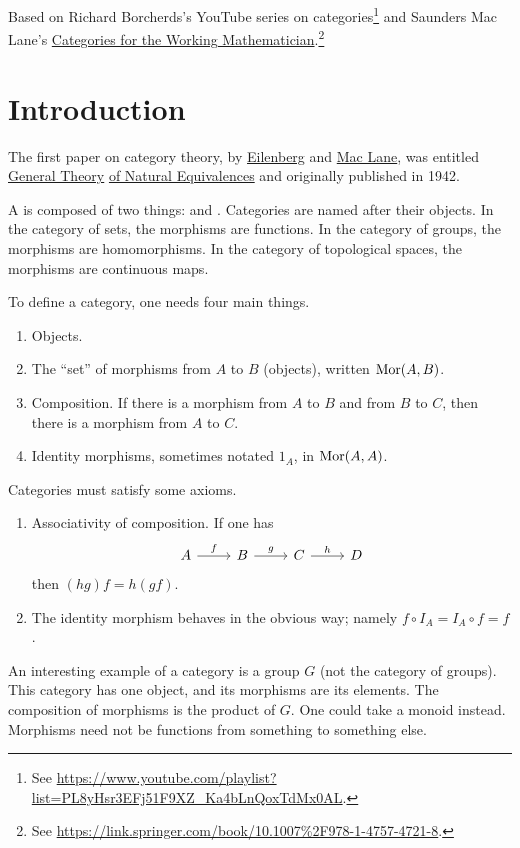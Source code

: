 \documentclass[11pt, oneside]{article}
\begin{document}
\maketitle
Based on {Richard Borcherds's YouTube series on categories}\footnote{See \url{https://www.youtube.com/playlist?list=PL8yHsr3EFj51F9XZ\_Ka4bLnQoxTdMx0AL}.} and Saunders Mac Lane's {\underline{Categories for the Working Mathematician}}.\footnote{See \url{https://link.springer.com/book/10.1007\%2F978-1-4757-4721-8}.} \color{black}\cite{CWM}
\tableofcontents
\section{Introduction}
The first paper on category theory, by \href{https://en.wikipedia.org/wiki/Samuel_Eilenberg}{\color{black}Eilenberg} and \href{https://en.wikipedia.org/wiki/Saunders_Mac_Lane}{\color{black}Mac Lane}, was entitled \underline{General Theory}  \underline{of Natural Equivalences} and originally published in 1942.

A \href{https://en.wikipedia.org/wiki/Category_(mathematics)}{} is composed of two things:  and . {Categories} are named after their objects. In the category of sets, the morphisms are functions. In the category of groups, the morphisms are homomorphisms. In the category of topological spaces, the morphisms are continuous maps.

To define a category, one needs four main things. 
\begin{enumerate}
\item Objects.
\item The ``set'' of morphisms from $A$ to $B$ (objects), written $\operatorname{Mor}( A, B)$.
\item Composition. If there is a morphism from $ A$ to $ B$ and from $ B$ to $ C$, then there is a morphism from $ A$ to $ C$.
\item Identity morphisms, sometimes notated $1_{ A}$, in $\operatorname{Mor}( A, A)$.
\end{enumerate}
Categories must satisfy some axioms.
\begin{enumerate}
\item Associativity of composition. If one has 
\[
\begin{tikzcd}
A\ar[r,"f"]&B\ar[r,"g"] & C\ar[r,"h"] & D
\end{tikzcd}
\]
then $(hg)f = h(gf)$.
\item The identity morphism behaves in the obvious way; namely $f\circ I_{ A} = I_{ A} \circ f = f$.
\end{enumerate}
An interesting example of a category is a group $G$ (not the category of groups). This category has one object, and its morphisms are its elements. The composition of morphisms is the product of $G$. One could take a monoid instead. Morphisms need not be functions from something to something else.
\end{document}
